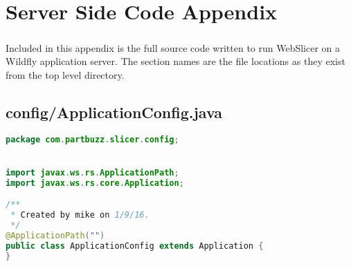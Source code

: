 \chapter{Server Side Code Appendix}
\paragraph{}
Included in this appendix is the full source code written to run WebSlicer on a Wildfly application server.
The section names are the file locations as they exist from the top level directory.


\section{config/ApplicationConfig.java}
\begin{lstlisting}[language=Java, label={lst:ApplicationConfig}, caption=A required file in JavaEE for declaring the default application path when deployed.]
package com.partbuzz.slicer.config;


import javax.ws.rs.ApplicationPath;
import javax.ws.rs.core.Application;

/**
 * Created by mike on 1/9/16.
 */
@ApplicationPath("")
public class ApplicationConfig extends Application {
}
\end{lstlisting}



